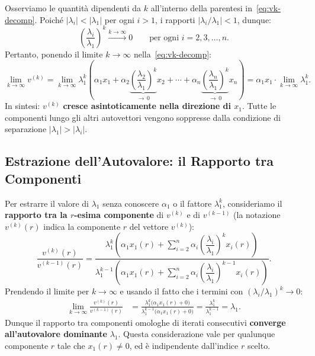 \documentclass[a4paper,12pt]{article}
\theoremstyle{definition}
\theoremstyle{remark}
\begin{document}
Osserviamo le quantità dipendenti da $k$ all'interno della parentesi in~\eqref{eq:vk-decomp}.
Poiché $|\lambda_i| < |\lambda_1|$ per ogni $i > 1$, i rapporti $|\lambda_i / \lambda_1| < 1$,
dunque:
\[
  \left(\frac{\lambda_i}{\lambda_1}\right)^k \xrightarrow{k \to \infty} 0
  \qquad \text{per ogni } i = 2, 3, \ldots, n.
\]
Pertanto, ponendo il limite $k \to \infty$ nella~\eqref{eq:vk-decomp}:
\[
  \lim_{k \to \infty} v^{(k)}
  = \lim_{k \to \infty} \lambda_1^k
    \left(
      \alpha_1 x_1
      + \alpha_2 \underbrace{\left(\frac{\lambda_2}{\lambda_1}\right)^k}_{\to\, 0} x_2
      + \cdots
      + \alpha_n \underbrace{\left(\frac{\lambda_n}{\lambda_1}\right)^k}_{\to\, 0} x_n
    \right)
  = \alpha_1 x_1 \cdot \lim_{k \to \infty} \lambda_1^k.
\]
In sintesi: $v^{(k)}$ \textbf{cresce asintoticamente nella direzione di $x_1$}. Tutte le
componenti lungo gli altri autovettori vengono soppresse dalla condizione di separazione
$|\lambda_1| > |\lambda_i|$.

\subsection{Estrazione dell'Autovalore: il Rapporto tra Componenti}

Per estrarre il valore di $\lambda_1$ senza conoscere $\alpha_1$ o il fattore $\lambda_1^k$,
consideriamo il \textbf{rapporto tra la $r$-esima componente} di $v^{(k)}$ e di $v^{(k-1)}$
(la notazione $v^{(k)}(r)$ indica la componente $r$ del vettore $v^{(k)}$):
\[
  \frac{v^{(k)}(r)}{v^{(k-1)}(r)}
  =
  \frac{
    \lambda_1^k
    \!\left(\alpha_1 x_1(r) + \displaystyle\sum_{i=2}^{n} \alpha_i
    \!\left(\dfrac{\lambda_i}{\lambda_1}\right)^{\!k} x_i(r)\right)
  }{
    \lambda_1^{k-1}
    \!\left(\alpha_1 x_1(r) + \displaystyle\sum_{i=2}^{n} \alpha_i
    \!\left(\dfrac{\lambda_i}{\lambda_1}\right)^{\!k-1} x_i(r)\right)
  }.
\]
Prendendo il limite per $k \to \infty$ e usando il fatto che i termini con
$(\lambda_i/\lambda_1)^k \to 0$:
\begin{align}
  \lim_{k \to \infty} \frac{v^{(k)}(r)}{v^{(k-1)}(r)}
  &= \frac{
      \lambda_1^k \bigl(\alpha_1 x_1(r) + 0\bigr)
    }{
      \lambda_1^{k-1} \bigl(\alpha_1 x_1(r) + 0\bigr)
    }
  = \frac{\lambda_1^k}{\lambda_1^{k-1}}
  = \lambda_1. \label{eq:rapporto-lambda}
\end{align}
Dunque il rapporto tra componenti omologhe di iterati consecutivi \textbf{converge
all'autovalore dominante} $\lambda_1$. Questa considerazione vale per qualunque componente
$r$ tale che $x_1(r) \neq 0$, ed è indipendente dall'indice $r$ scelto.
\end{document}
